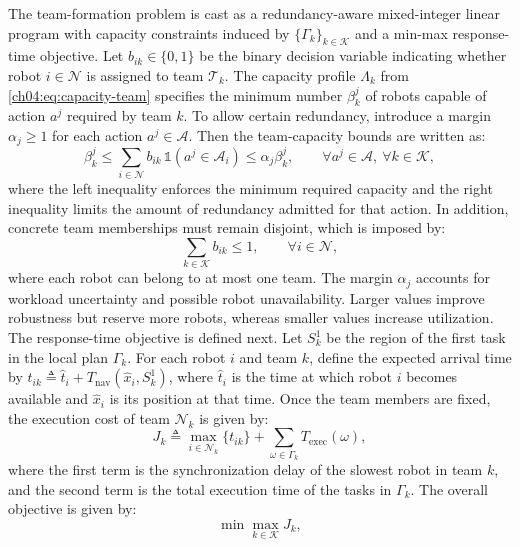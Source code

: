 The team-formation problem is cast as a redundancy-aware mixed-integer linear
program with capacity constraints induced by $\{\Gamma_k\}_{k\in\mathcal{K}}$
and a min-max response-time objective. Let $b_{ik}\in\{0,1\}$ be the binary
decision variable indicating whether robot
$i\in\mathcal{N}$ is assigned to team $\mathcal{T}_k$. The capacity profile
$\Lambda_k$ from \eqref{ch04:eq:capacity-team} specifies the minimum number
$\beta_k^j$ of robots capable of action $a^j$ required by team $k$. To allow
certain redundancy, introduce a margin $\alpha_j\geq 1$ for each action
$a^j\in\mathcal{A}$. Then the team-capacity bounds are written as:
\begin{equation}
\label{ch04:eq:bound_form}
\beta_k^j
\leq
\sum_{i\in\mathcal{N}} b_{ik}\,\mathds{1}(a^j\in\mathcal{A}_i)
\leq
\alpha_j\beta_k^j,
\qquad \forall a^j\in\mathcal{A},\ \forall k\in\mathcal{K},
\end{equation}
where the left inequality enforces the minimum required capacity and the right
inequality limits the amount of redundancy admitted for that action. In
addition, concrete team memberships must remain disjoint, which is imposed by:
\begin{equation}
\label{ch04:eq:disjoint_membership}
\sum_{k\in\mathcal{K}} b_{ik}\leq 1,
\qquad \forall i\in\mathcal{N},
\end{equation}
where each robot can belong to at most one team.
The margin $\alpha_j$ accounts for workload uncertainty and possible robot
unavailability. Larger values improve robustness but reserve more robots,
whereas smaller values increase utilization. The response-time objective is
defined next. Let
$S_k^1$ be the region of the first task in the local plan $\Gamma_k$. For each
robot $i$ and team $k$, define the expected arrival time by
$t_{ik}\triangleq
\widehat{t}_i+T_{\mathrm{nav}}(\widehat{x}_i,S_k^1)$,
where $\widehat{t}_i$ is the time at which robot $i$ becomes available and
$\widehat{x}_i$ is its position at that time. Once the team members are fixed,
the execution cost of team $\mathcal{N}_k$ is given by:
\begin{equation}
\label{ch04:eq:team_cost}
J_k \triangleq
\max_{i\in\mathcal{N}_k}\{t_{ik}\}
+\sum_{\omega\in\Gamma_k} T_{\mathrm{exec}}(\omega),
\end{equation}
where the first term is the synchronization delay of the slowest robot
in team $k$, and the second term is the total execution time of the
tasks in $\Gamma_k$. The overall objective is given by:
\begin{equation}
\label{ch04:eq:formation_objective}
\min \max_{k\in\mathcal{K}} J_k,
\end{equation}

